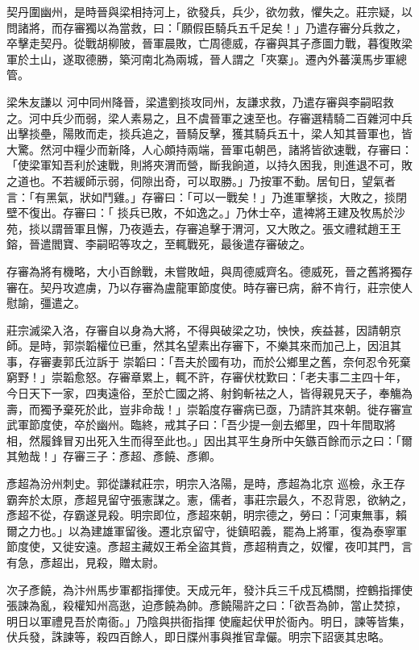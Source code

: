 \begin{pinyinscope}
 契丹圍幽州，是時晉與梁相持河上，欲發兵，兵少，欲勿救，懼失之。莊宗疑，以問諸將，而存審獨以為當救，曰：「願假臣騎兵五千足矣！」乃遣存審分兵救之，卒擊走契丹。從戰胡柳陂，晉軍晨敗，亡周德威，存審與其子彥圖力戰，暮復敗梁軍於土山，遂取德勝，築河南北為兩城，晉人謂之「夾寨」。遷內外蕃漢馬步軍總管。



 梁朱友謙以
 河中同州降晉，梁遣劉掞攻同州，友謙求救，乃遣存審與李嗣昭救之。河中兵少而弱，梁人素易之，且不虞晉軍之速至也。存審選精騎二百雜河中兵出擊掞壘，陽敗而走，掞兵追之，晉騎反擊，獲其騎兵五十，梁人知其晉軍也，皆大驚。然河中糧少而新降，人心頗持兩端，晉軍屯朝邑，諸將皆欲速戰，存審曰：「使梁軍知吾利於速戰，則將夾渭而營，斷我餉道，以持久困我，則進退不可，敗之道也。不若緩師示弱，伺隙出奇，可以取勝。」乃按軍不動。居旬日，望氣者言：「有黑氣，狀如鬥雞。」存審曰：「可以一戰矣！」乃進軍擊掞，大敗之，掞閉壁不復出。存審曰：「
 掞兵已敗，不如逸之。」乃休士卒，遣裨將王建及牧馬於沙苑，掞以謂晉軍且懈，乃夜遁去，存審追擊于渭河，又大敗之。張文禮弒趙王王鎔，晉遣閻寶、李嗣昭等攻之，至輒戰死，最後遣存審破之。



 存審為將有機略，大小百餘戰，未嘗敗衄，與周德威齊名。德威死，晉之舊將獨存審在。契丹攻遮虜，乃以存審為盧龍軍節度使。時存審已病，辭不肯行，莊宗使人慰諭，彊遣之。



 莊宗滅梁入洛，存審自以身為大將，不得與破梁之功，怏怏，疾益甚，因請朝京師。是時，郭崇韜權位已重，然其名望素出存審下，不樂其來而加己上，因沮其事，存審妻郭氏泣訴于
 崇韜曰：「吾夫於國有功，而於公鄉里之舊，奈何忍令死棄窮野！」崇韜愈怒。存審章累上，輒不許，存審伏枕歎曰：「老夫事二主四十年，今日天下一家，四夷遠俗，至於亡國之將、射鉤斬袪之人，皆得親見天子，奉觴為壽，而獨予棄死於此，豈非命哉！」崇韜度存審病已亟，乃請許其來朝。徙存審宣武軍節度使，卒於幽州。臨終，戒其子曰：「吾少提一劍去鄉里，四十年間取將相，然履鋒冒刃出死入生而得至此也。」因出其平生身所中矢鏃百餘而示之曰：「爾其勉哉！」存審三子：彥超、彥饒、彥卿。



 彥超為汾州刺史。郭從謙弒莊宗，明宗入洛陽，是時，彥超為北京
 巡檢，永王存霸奔於太原，彥超見留守張憲謀之。憲，儒者，事莊宗最久，不忍背恩，欲納之，彥超不從，存霸遂見殺。明宗即位，彥超來朝，明宗德之，勞曰：「河東無事，賴爾之力也。」以為建雄軍留後。遷北京留守，徙鎮昭義，罷為上將軍，復為泰寧軍節度使，又徙安遠。彥超主藏奴王希全盜其貲，彥超稍責之，奴懼，夜叩其門，言有急，彥超出，見殺，贈太尉。



 次子彥饒，為汴州馬步軍都指揮使。天成元年，發汴兵三千戍瓦橋關，控鶴指揮使張諫為亂，殺權知州高逖，迫彥饒為帥。彥饒陽許之曰：「欲吾為帥，當止焚掠，明日以軍禮見吾於南衙。」乃陰與拱衙指揮
 使龐起伏甲於衙內。明日，諫等皆集，伏兵發，誅諫等，殺四百餘人，即日牒州事與推官韋儼。明宗下詔褒其忠略。




\end{pinyinscope}
